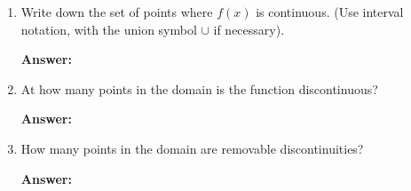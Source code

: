 \documentclass[fleqn,12pt]{article}
\newcommand{\<}{\ensuremath{\langle}}
\renewcommand{\>}{\ensuremath{\rangle}}
\begin{document}
\begin{enumerate}
      \bigskip
      \begin{enumerate}
      \item 
        Write down the set of points where $f(x)$
        is continuous. (Use interval notation, with the union symbol $\cup$ if
        necessary). 

        \vskip1cm


        \ifthenelse{\boolean{answers}}{
          {\small          
            \hfill {\bf Answer:} $[-4, -2)\cup (-2, 2) \cup (2, 4) \cup (4, 6) \cup (6, 8)$ \phantom{XXXX}
          }} {
            \hfill {\bf Answer:}
            \underline{\phantom{XXXXXXXXXXXXXXXXXXXXXXXXXXXXX}}
          }

        \vskip1cm

      \item At how many points in the domain is the function discontinuous?

        \bigskip

         {
          \hfill {\bf Answer:} \underline{\phantom{XXXXXXX}}
        }
        \bigskip

      \item How many points in the domain are removable discontinuities?

        \bigskip

         {
          \hfill {\bf Answer:} \underline{\phantom{XXXXXXX}}
        }
        \bigskip


      \end{enumerate}

    \end{enumerate}
\end{document}
